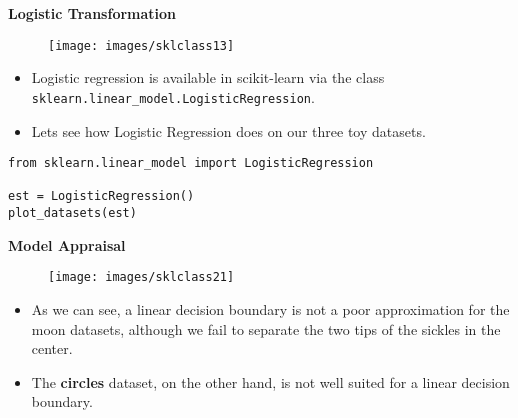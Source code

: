 \documentclass[SKL-MASTER.tex]{subfiles}
\begin{document}
\newpage
\textbf{Logistic Transformation}
\begin{figure}[h!]
\centering
\texttt{[image: images/sklclass13]}

\end{figure}


\begin{itemize}
\item Logistic regression is available in scikit-learn via the class \texttt{sklearn.linear\_model.LogisticRegression}. 
\item Lets see how Logistic Regression does on our three toy datasets.
\end{itemize}



{
\Large
\begin{framed}
		\begin{verbatim}
from sklearn.linear_model import LogisticRegression

est = LogisticRegression()
plot_datasets(est)
	\end{verbatim}
\end{framed}
}

\newpage
\textbf{Model Appraisal}
	\begin{figure}[h!]
		\centering
		\texttt{[image: images/sklclass21]}
		
	\end{figure}

\begin{itemize}
\item	As we can see, a linear decision boundary is not a poor approximation for the moon datasets, although we fail to separate the two tips of the sickles in the center. 
\item The \textbf{circles} dataset, on the other hand, is not well suited for a linear decision boundary. 
\end{itemize}
\end{document}

